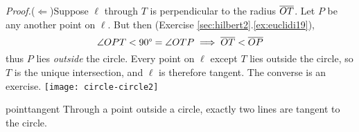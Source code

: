 \begin{tcolorbox}[proofstyle, lower separated=false, sidebyside, sidebyside align=top seam, sidebyside gap=0pt, righthand width=0.33\linewidth]
	\emph{Proof.}\lstsp ($\Leftarrow$)\lstsp Suppose $\ell$ through $T$ is perpendicular to the radius $\cl{OT}$.\smallbreak
	Let $P$ be any another point on $\ell$. But then (Exercise \ref*{sec:hilbert2}.\ref{ex:euclidi19}),
	\[
		\angle OPT<\ang{90}=\angle OTP\implies \cl{OT}<\cl{OP}
	\]
	thus $P$ lies \emph{outside} the circle. Every point on $\ell$ except $T$ lies outside the circle, so $T$ is the unique intersection, and $\ell$ is therefore tangent.\medbreak
	The converse is an exercise.
	\tcblower
	\flushright
	\texttt{[image: circle-circle2]}\\[-8pt]
	\hfill\qedsymbol
\end{tcolorbox}

\begin{thm}{}{pointtangent}
	Through a point outside a circle, exactly two lines are tangent to the circle.
\end{thm}

